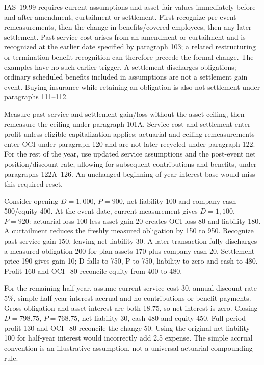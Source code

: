 IAS~19.99 \citep[IAS~19.99--112,120--126]{eu20231803} requires current assumptions and asset fair values immediately before and after amendment, curtailment or settlement. First recognize pre-event remeasurements, then the change in benefits/covered employees, then any later settlement. Past service cost arises from an amendment or curtailment and is recognized at the earlier date specified by paragraph 103; a related restructuring or termination-benefit recognition can therefore precede the formal change. The examples have no such earlier trigger. A settlement discharges obligations; ordinary scheduled benefits included in assumptions are not a settlement gain event. Buying insurance while retaining an obligation is also not settlement under paragraphs 111--112.

Measure past service and settlement gain/loss without the asset ceiling, then remeasure the ceiling under paragraph 101A. Service cost and settlement enter profit unless eligible capitalization applies; actuarial and ceiling remeasurements enter OCI under paragraph 120 and are not later recycled under paragraph 122. For the rest of the year, use updated service assumptions and the post-event net position/discount rate, allowing for subsequent contributions and benefits, under paragraphs 122A--126. An unchanged beginning-of-year interest base would miss this required reset.

Consider opening \(D=1{,}000\), \(P=900\), net liability 100 and company cash 500/equity 400. At the event date, current measurement gives \(D=1{,}100\), \(P=920\): actuarial loss 100 less asset gain 20 creates OCI loss 80 and liability 180. A curtailment reduces the freshly measured obligation by 150 to 950. Recognize past-service gain 150, leaving net liability 30. A later transaction fully discharges a measured obligation 200 for plan assets 170 plus company cash 20. Settlement price 190 gives gain 10; D falls to 750, P to 750, liability to zero and cash to 480. Profit 160 and OCI−80 reconcile equity from 400 to 480.

For the remaining half-year, assume current service cost 30, annual discount rate 5\%, simple half-year interest accrual and no contributions or benefit payments. Gross obligation and asset interest are both 18.75, so net interest is zero. Closing \(D=798.75\), \(P=768.75\), net liability 30, cash 480 and equity 450. Full period profit 130 and OCI−80 reconcile the change 50. Using the original net liability 100 for half-year interest would incorrectly add 2.5 expense. The simple accrual convention is an illustrative assumption, not a universal actuarial compounding rule.

